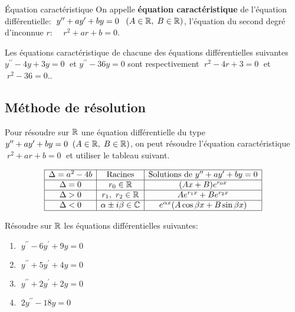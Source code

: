  \begin{definition}{ Équation  caractéristique}
On appelle  \textbf{équation caractéristique} de l'équation différentielle: $\; y^{\prime \prime} +ay^{\prime}+by=0 \;\;\;(A\in\mathbb{R},\; B\in\mathbb{R})$, l'équation du second degré  d'inconnue $ r :\;\; $  $\; r^{2}+ar+b=0 $.
\end{definition}
\begin{example}
Les équations caractéristique de chacune des   équations différentielles suivantes \\$ y^{\prime \prime}-4y+3y=0 \;$ et \;$ y^{\prime \prime}-36y=0 $ sont respectivement  $\; r^{2} -4r+3=0\;$ et $\; r^{2}-36=0.$. 
\end{example}
\subsection*{Méthode de résolution}
Pour résoudre sur $ \mathbb{R} $  une équation différentielle du type $ y^{\prime \prime}+ ay^{\prime}+by=0\;\;(A\in\mathbb{R},\; B\in\mathbb{R})$, on peut  résoudre l'équation caractéristique \\ $\; r^{2}+ar+b=0 \;$  et utiliser le tableau suivant.




$$
\begin{array}{|c|c|c|}
\hline
\Delta = a^2 - 4b & \text{Racines} & \text{Solutions de } y'' + ay' + by = 0 \\
\hline
\Delta = 0 & r_0 \in \mathbb{R} & (Ax + B)e^{r_0 x} \\
\hline
\Delta > 0 & r_1,\ r_2 \in \mathbb{R} & Ae^{r_1 x} + Be^{r_2 x} \\
\hline
\Delta < 0 & \alpha \pm i\beta \in \mathbb{C} & e^{\alpha x}(A\cos\beta x + B\sin\beta x) \\
\hline
\end{array}
$$

 
\begin{exercice}
 Résoudre sur $ \mathbb{R} $  les  équations différentielles suivantes:
 \begin{enumerate}
  \item $ \; y^{\prime \prime}-6y^{\prime}+9y=0 $
 \item $ \; y^{\prime \prime}+ 5y^{\prime}+4y=0 $
 \item $  \; y^{\prime \prime}+2 y^{\prime}+2y=0 $
 \item $ \; 2 y^{\prime \prime}-18y=0 $
 \end{enumerate}
\end{exercice}
 
